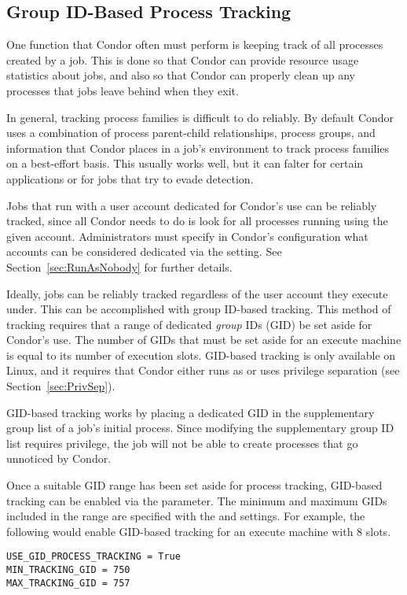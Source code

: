 \subsection{\label{sec:GroupTracking}Group ID-Based Process Tracking} 

One function that Condor often must perform is keeping track of all
processes created by a job. This is done so that Condor can provide
resource usage statistics about jobs, and also so that Condor can properly
clean up any processes that jobs leave behind when they exit.

In general, tracking process families is difficult to do reliably.
By default Condor uses a combination of process parent-child
relationships, process groups, and information that Condor places in a
job's environment to track process families on a best-effort
basis. This usually works well, but it can falter for certain
applications or for jobs that try to evade detection.

Jobs that run with a user account dedicated for Condor's use
can be reliably tracked, since all Condor needs to do is look for all
processes running using the given account. Administrators must specify
in Condor's configuration what accounts can be considered dedicated
via the  setting. See
Section~\ref{sec:RunAsNobody} for further details.

Ideally, jobs can be reliably tracked regardless of the user account
they execute under. This can be accomplished with group ID-based
tracking. This method of tracking requires that a range of dedicated
\emph{group} IDs (GID) be set aside for Condor's use. The number of GIDs
that must be set aside for an execute machine is equal to its number
of execution slots. GID-based tracking is only available on Linux, and
it requires that Condor either runs as  or uses privilege
separation (see Section~\ref{sec:PrivSep}).

GID-based tracking works by placing a dedicated GID in the
supplementary group list of a job's initial process. Since modifying
the supplementary group ID list requires
 privilege, the job will not be able to create processes
that go unnoticed by Condor.

Once a suitable GID range has been set aside for process tracking,
GID-based tracking can be enabled via the
 parameter. The minimum and maximum
GIDs included in the range are specified with the
 and 
settings. For example, the following would enable GID-based tracking
for an execute machine with 8 slots.
\begin{verbatim}
USE_GID_PROCESS_TRACKING = True
MIN_TRACKING_GID = 750
MAX_TRACKING_GID = 757
\end{verbatim}

